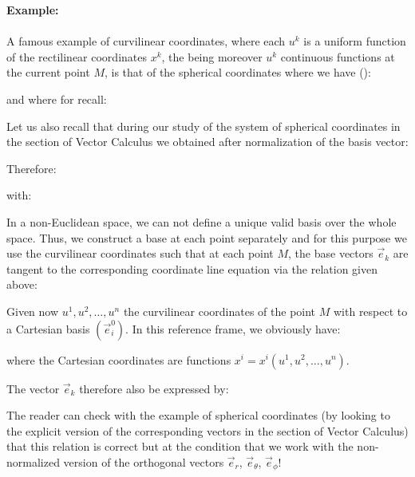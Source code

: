 	\begin{tcolorbox}[colframe=black,colback=white,sharp corners]
	\textbf{{\Large {}}Example:}\\\\
	A famous example of curvilinear coordinates, where each $u^k$ is a uniform function of the rectilinear coordinates $x^k$, the being moreover $u^k$  continuous functions at the current point $M$, is that of the spherical coordinates where we have ():
	
	and where for recall:
	
	Let us also recall that during our study of the system of spherical coordinates in the section of Vector Calculus we obtained after normalization of the basis vector:
	
	Therefore:
	
	with:
	
	\end{tcolorbox}
	In a non-Euclidean space, we can not define a unique valid basis over the whole space. Thus, we construct a base at each point separately and for this purpose we use the curvilinear coordinates such that at each point $M$, the base vectors $\vec{e}_k$ are tangent to the corresponding coordinate line equation via the relation given above:
	
	Given now $u^1, u^2, \ldots, u^n$ the curvilinear coordinates of the point $M$ with respect to a Cartesian basis $(\vec{e}_i^0)$. In this reference frame, we obviously have:
	
	where the Cartesian coordinates are functions $x^i=x^i(u^1,u^2,\ldots,u^n)$.
	
	The vector $\vec{e}_k$ therefore also be expressed by:
	
	The reader can check with the example of spherical coordinates (by looking to the explicit version of the corresponding vectors in the section of Vector Calculus) that this relation is correct but at the condition that we work with the non-normalized version of the orthogonal vectors $\vec{e}_r$, $\vec{e}_\theta$, $\vec{e}_\phi$!
	

